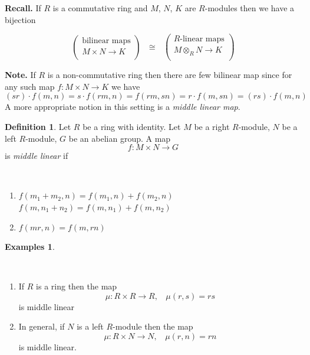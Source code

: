 \documentclass[12pt, letterpaper, oneside]{article}
\theoremstyle{plain}
\theoremstyle{definition}
\newtheorem{definition}[theorem]{Definition}
\newtheorem{examples}[theorem]{Examples}
\newcommand{\benu}{\begin{enumerate}}
\newcommand{\eenu}{\end{enumerate}}
\newcommand{\vs}{\vskip 5mm}
\newcommand{\isep}[1][0]{\setlength{\itemsep}{#1 mm}}
\begin{document}
\textbf{Recall.} If $R$ is a commutative ring and  $M$, $N$, $K$ are $R$-modules 
then we have a bijection

$$
\begin{pmatrix}
\text{bilinear maps} \\
M\times N \to K \\
\end{pmatrix}
\ \ \ \cong \ \ \ 
\begin{pmatrix}
\text{$R$-linear maps} \\
M\otimes_{R} N \to K \\
\end{pmatrix}
$$

\vs\vs


\textbf{Note.} If $R$ is a non-commutative ring then there are few bilinear map  since 
for any such map $f\colon M\times N \to K$ we have 
$$(sr)\cdot f(m, n) = s\cdot f(rm, n) = f(rm, sn) = r\cdot f(m, sn) = (rs)\cdot f(m, n)$$
A more appropriate notion in this setting is a \emph{middle linear map}.

\vs\vs

\begin{definition}
Let $R$ be a ring with identity.  Let $M$ be a right $R$-module, 
$N$ be a left $R$-module, $G$ be an abelian group. A map 
$$f\colon M\times N \to G$$
is \emph{middle linear} if 

\vskip -13mm

\ 
\benu
\item $f(m_{1}+m_{2}, n) = f(m_{1}, n)+ f(m_{2}, n)$ \\
$f(m, n_{1}+ n_{2}) = f(m, n_{1})+ f(m, n_{2})$

\item $f(mr, n) =  f(m, rn)$
\eenu

\end{definition}


\vs\vs

\begin{examples}\ 

\vskip -13mm
 
\ 
\benu
\isep[5]
\item If $R$ is a ring then the map 
$$\mu\colon R\times R \to R, \ \ \ \ \mu(r, s) = rs $$
is middle linear
\item In general, if $N$ is a left $R$-module then the map 
$$\mu\colon R\times N \to N, \ \ \ \ \mu(r, n) = rn$$
is middle linear. 
\eenu

\end{examples}
\end{document}

